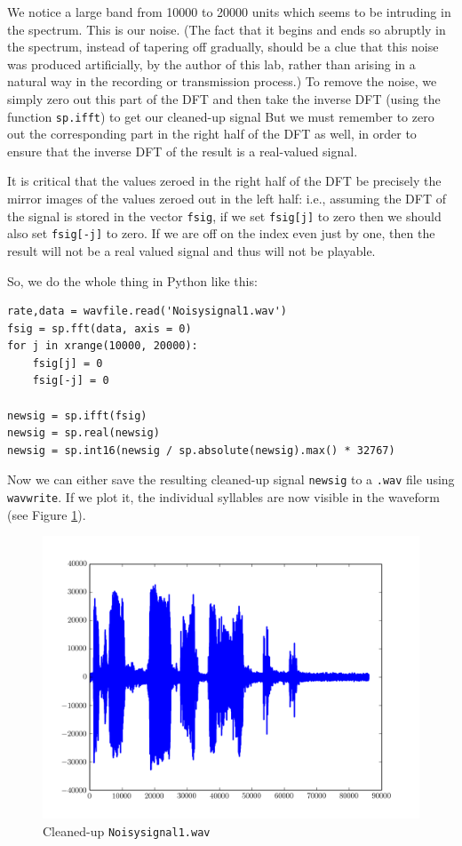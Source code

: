 We notice a large band from 10000 to 20000 units which seems to be intruding in the spectrum.
This is our noise.
(The fact that it begins and ends so abruptly in the spectrum, instead of tapering off gradually, should be a clue that this noise was produced artificially, by the author of this lab, rather than arising in a natural way in the recording or transmission process.)
To remove the noise, we simply zero out this part of the DFT and then take the inverse DFT (using the function \texttt{sp.ifft}) to get our cleaned-up signal
 But we must remember to zero out the corresponding part in the right half of the DFT as well, in order to ensure that the inverse DFT of the result is a real-valued signal.

It is critical that the values zeroed in the right half of the DFT be precisely the mirror images of the values zeroed out in the left half: i.e., assuming the DFT of the signal is stored in the vector \texttt{fsig}, if we set \texttt{fsig[j]} to zero then we should also set \texttt{fsig[-j]} to zero.
If we are off on the index even just by one, then the result will not be a real valued signal and thus will not be playable.

So, we do the whole thing in Python like this:
\begin{lstlisting}
rate,data = wavfile.read('Noisysignal1.wav')
fsig = sp.fft(data, axis = 0)
for j in xrange(10000, 20000):
    fsig[j] = 0
    fsig[-j] = 0

newsig = sp.ifft(fsig)
newsig = sp.real(newsig)
newsig = sp.int16(newsig / sp.absolute(newsig).max() * 32767)
\end{lstlisting}

Now we can either save the resulting cleaned-up signal \texttt{newsig} to a \texttt{.wav} file using \texttt{wavwrite}.
If we plot it, the individual syllables are now visible in the waveform (see Figure \ref{cleansignal}).

\begin{figure}[ht]\caption{Cleaned-up \texttt{Noisysignal1.wav} }\label{cleansignal}\centering\includegraphics[width=\textwidth]{Cleanedsignal}\end{figure}

